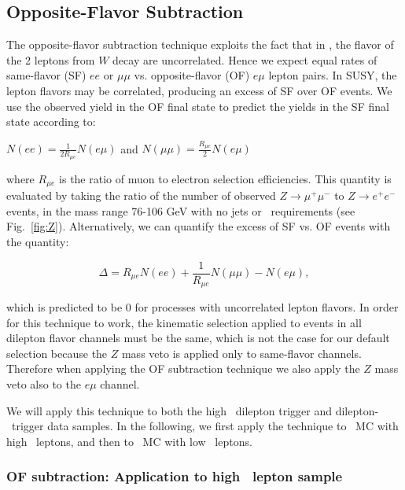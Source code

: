 \subsection{Opposite-Flavor Subtraction}
\label{sec:ofsubtraction}

The opposite-flavor subtraction technique exploits the fact that in \ttbar, the flavor
of the 2 leptons from $W$ decay are uncorrelated. Hence we expect equal rates of same-flavor (SF) 
$ee$ or $\mu\mu$ vs. opposite-flavor (OF) $e\mu$ lepton pairs. In SUSY, the lepton flavors may be 
correlated, producing an excess of SF over OF events. We use the observed 
yield in the OF final state to predict the yields in the SF final state according to:

\begin{center}
$N(ee)     = \frac{1}{2R_{\mu e}}N(e\mu)$ and $N(\mu\mu) = \frac{R_{\mu e}}{2}N(e\mu)$
\end{center}

where $R_{\mu e}$ is the ratio of muon to electron selection efficiencies.
This quantity is evaluated by taking the ratio of the number of observed
$Z \to \mu^+\mu^-$ to $Z \to e^+e^-$ events, in the mass range 76-106 GeV
with no jets or \met\ requirements (see Fig.~\ref{fig:Z}). Alternatively, we can quantify
the excess of SF vs. OF events with the quantity:

\begin{equation}
\label{eq:ofhighpt}
\Delta = R_{\mu e}N(ee) + \frac{1}{R_{\mu e}}N(\mu\mu) - N(e\mu),
\end{equation}

which is predicted to be 0 for processes with uncorrelated lepton flavors. 
In order
for this technique to work, the kinematic selection applied to events in all dilepton
flavor channels must be the same, which is not the case for our default selection because the
$Z$ mass veto is applied only to same-flavor channels. Therefore when applying the OF
subtraction technique we also apply the $Z$ mass veto also to the $e\mu$ channel. 

We will apply this technique to both the high \pt\ dilepton trigger and dilepton-\Ht\ trigger data samples.
In the following, we first apply the technique to \ttbar\ MC with high \pt\ leptons, and then
to \ttbar\ MC with low \pt\ leptons.

\subsubsection{OF subtraction: Application to high \pt\ lepton sample}

